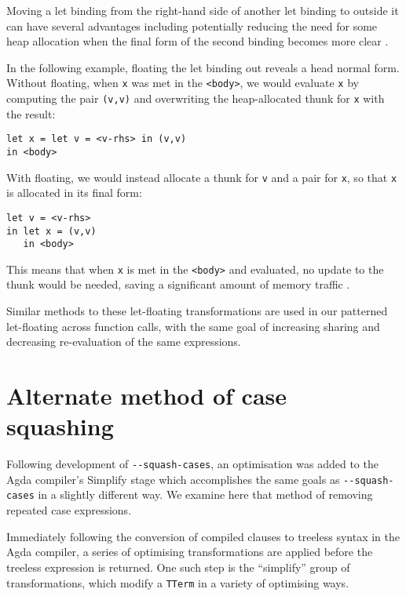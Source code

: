 \begin{enumerate}
Moving a let binding from the right-hand side of another let binding to outside it can have several advantages including potentially reducing the need for some heap allocation when the final form of the second binding becomes more clear \citep{jones1996}.

In the following example, floating the let binding out reveals a head normal form. Without floating, when \lstinline{x} was met in the \lstinline{<body>}, we would evaluate \lstinline{x} by computing the pair \lstinline{(v,v)} and overwriting the heap-allocated thunk for \lstinline{x} with the result:

\begin{lstlisting}
let x = let v = <v-rhs> in (v,v)
in <body>
\end{lstlisting}

With floating, we would instead allocate a thunk for \lstinline{v} and a pair for \lstinline{x}, so that \lstinline{x} is allocated in its final form:

\begin{lstlisting}
let v = <v-rhs>
in let x = (v,v)
   in <body>
\end{lstlisting}

This means that when \lstinline{x} is met in the \lstinline{<body>} and evaluated, no update to the thunk would be needed, saving a significant amount of memory traffic \citep{jones1996}.

\end{enumerate}

Similar methods to these let-floating transformations are used in our patterned let-floating across function calls, with the same goal of increasing sharing and decreasing re-evaluation of the same expressions.

\section{Alternate method of case squashing}
\label{sub:alternate_case_squash}

Following development of \texttt{-{}-squash-cases}, an optimisation was added to the Agda compiler's Simplify stage which accomplishes the same goals as \texttt{-{}-squash-cases} in a slightly different way. We examine here that method of removing repeated case expressions.

Immediately following the conversion of compiled clauses to treeless syntax in the Agda compiler, a series of optimising transformations are applied before the treeless expression is returned. One such step is the ``simplify'' group of transformations, which modify a \lstinline{TTerm} in a variety of optimising ways.

